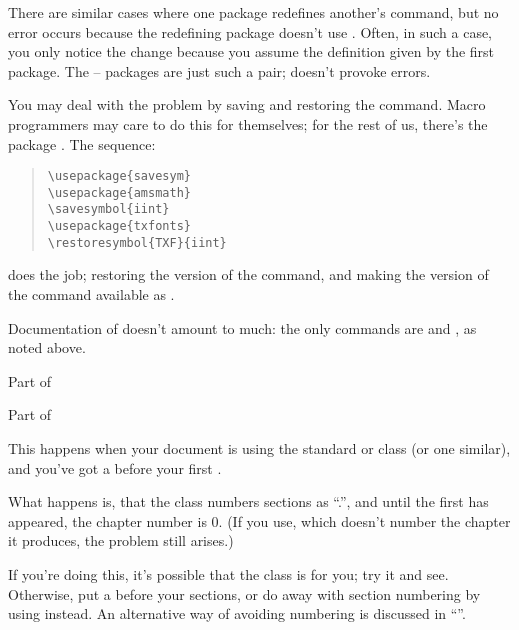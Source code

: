 There are similar cases where one package redefines another's command,
but no error occurs because the redefining package doesn't use
.  Often, in such a case, you only notice the change
because you assume the definition given by the first package.  The
-- packages are just such a pair;
 doesn't provoke errors.

You may deal with the problem by saving and restoring the command.
Macro programmers may care to do this for themselves; for the rest of
us, there's the package .  The sequence:
\begin{quote}
\begin{verbatim}
\usepackage{savesym}
\usepackage{amsmath}
\savesymbol{iint}
\usepackage{txfonts}
\restoresymbol{TXF}{iint}
\end{verbatim}
\end{quote}
does the job; restoring the  version of the command,
and making the  version of the command available as
.

Documentation of  doesn't amount to much: the only
commands are  and , as noted above.
\begin{ctanrefs}
\item[amsmath.sty]Part of 
\item[savesym.sty]
\item[txfonts.sty]Part of 
\end{ctanrefs}


This happens when your document is using the standard  or
 class (or one similar), and you've got a 
before your first .

What happens is, that the class numbers sections as %
``.'', and until the first
 has appeared, the chapter number is 0.  (If you
use, which doesn't number the chapter it produces, the
problem still arises.)

If you're doing this, it's possible that the  class
is for you; try it and see.  Otherwise, put a  before
your sections, or do away with section numbering by using
 instead.  An alternative way of avoiding numbering is
discussed in %
``''.

